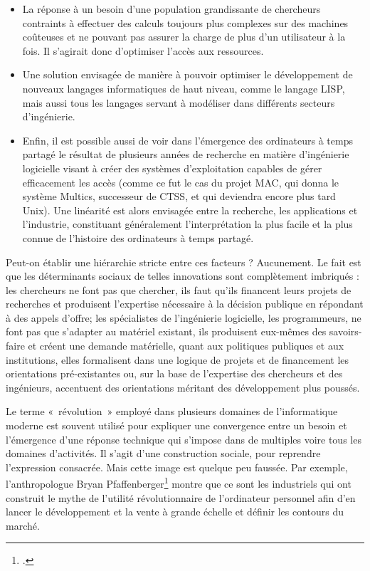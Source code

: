 \documentclass{FramateX}
\begin{document}
\begin{refsection}
\begin{itemize}
\item La réponse à un besoin d'une population
grandissante de chercheurs contraints à effectuer des calculs toujours
plus complexes sur des machines coûteuses et ne pouvant pas assurer la
charge de plus d'un utilisateur à la fois. Il
s'agirait donc d'optimiser
l'accès aux ressources.
\item Une solution envisagée de manière à pouvoir optimiser le
développement de nouveaux langages informatiques de haut niveau, comme
le langage LISP, mais aussi tous les langages servant à modéliser dans
différents secteurs d'ingénierie. 
\item Enfin, il est possible aussi de voir dans
l'émergence des ordinateurs à temps partagé le
résultat de plusieurs années de recherche en matière
d'ingénierie logicielle visant à créer des systèmes
d'exploitation capables de gérer efficacement les
accès (comme ce fut le cas du projet MAC, qui donna le système Multics,
successeur de CTSS, et qui deviendra encore plus tard Unix). Une
linéarité est alors envisagée entre la recherche, les applications et
l'industrie, constituant généralement
l'interprétation la plus facile et la plus connue de
l'histoire des ordinateurs à temps partagé.
\end{itemize}
Peut-on établir une hiérarchie stricte entre ces facteurs ? Aucunement.
Le fait est que les déterminants sociaux de telles innovations sont
complètement imbriqués : les chercheurs ne font pas que chercher, ils
faut qu'ils financent leurs projets de recherches et
produisent l'expertise nécessaire à la décision
publique en répondant à des appels d'offre; les
spécialistes de l'ingénierie logicielle, les
programmeurs, ne font pas que s'adapter au matériel
existant, ils produisent eux-mêmes des savoirs-faire et créent une
demande matérielle, quant aux politiques publiques et aux institutions,
elles formalisent dans une logique de projets et de financement les
orientations pré-existantes ou, sur la base de
l'expertise des chercheurs et des ingénieurs,
accentuent des orientations méritant des développement plus poussés. 

Le terme «~révolution~» employé dans plusieurs domaines de
l'informatique moderne est souvent utilisé pour
expliquer une convergence entre un besoin et
l'émergence d'une réponse technique
qui s'impose dans de multiples voire tous les domaines
d'activités. Il s'agit
d'une construction sociale, pour reprendre
l'expression consacrée. Mais cette image est quelque peu faussée. Par
exemple, l'anthropologue Bryan Pfaffenberger\footnote{\cite{pfaffenbergersocial1988}.} montre que
ce sont les industriels qui ont construit le mythe de
l'utilité révolutionnaire de l'ordinateur personnel
afin d'en lancer le développement et la vente à grande échelle et
définir les contours du marché.


\end{refsection}
\end{document}
